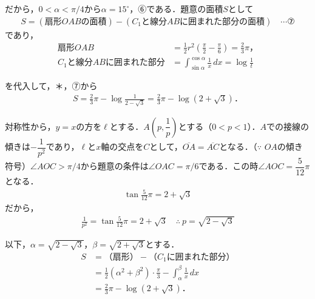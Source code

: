 \documentclass[../main.tex]{subfiles}
\begin{document}
だから，$0<\alpha<\pi/4$から$\alpha=15^\circ$，⑥である．題意の面積$S$として
\begin{align*}
  S=(\text{扇形}OAB\text{の面積})-(\text{$C_1$と線分}AB\text{に囲まれた部分の面積})\quad\cdots⑦
\end{align*}
であり，
\begin{align*}
  \text{扇形}OAB&=\frac12r^2\left(\frac\pi2-\frac\pi6\right)=\frac23\pi，\\
  \text{$C_1$と線分}AB\text{に囲まれた部分}&=\int_{\sin\alpha}^{\cos\alpha}\frac{1}{x}\,dx=\log\frac1t
\end{align*}

を代入して，＊，⑦から
\begin{align*}
  S=\frac23\pi-\log\frac{1}{2-\sqrt3}=\frac23\pi-\log(2+\sqrt3)．
\end{align*}

\bigskip
\noindent{\bf [解2]}
対称性から，$y=x$の方を$\ell$とする．$A\left(p,\dfrac1p\right)$とする（$0<p<1$）．$A$での接線の傾きは$-\dfrac{1}{p^2}$であり，$\ell$と$x$軸の交点を$C$として，$\overline{OA}=\overline{AC}$となる．（$\because$ $OA$の傾き符号）$\angle AOC>\pi/4$から題意の条件は$\angle OAC=\pi/6$である．この時$\angle AOC=\dfrac{5}{12}\pi$となる．
\begin{align*}
  \tan\frac{5}{12}\pi=2+\sqrt3
\end{align*}
だから，
\begin{align*}
  \frac{1}{p^2}=\tan\frac{5}{12}\pi=2+\sqrt3\quad\therefore\ p=\sqrt{2-\sqrt3}
\end{align*}

以下，$\alpha=\sqrt{2-\sqrt3}$，$\beta=\sqrt{2+\sqrt3}$とする．
\begin{align*}
  S&=\text{（扇形）}-\text{（$C_1$に囲まれた部分）}\\
  &=\frac12(\alpha^2+\beta^2)\cdot\frac\pi3-\int_\alpha^\beta\frac1x\,dx\\
  &=\frac23\pi-\log(2+\sqrt3)．
\end{align*}

\newpage
\end{document}
